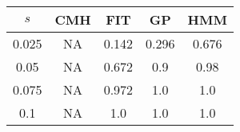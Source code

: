 \centering \begin{tabular}{c|c|c|c|c}
$s$	&CMH	&FIT	&GP	&HMM\\\hline
0.025	&NA	&0.142	&0.296	&0.676\\
0.05	&NA	&0.672	&0.9	&0.98\\
0.075	&NA	&0.972	&1.0	&1.0\\
0.1	&NA	&1.0	&1.0	&1.0\\
\end{tabular}
